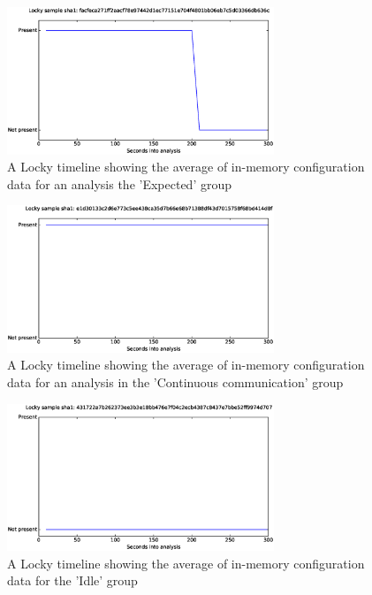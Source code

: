 \documentclass[conference]{IEEEtran}
\begin{document}
\begin{figure}[h]
    \includegraphics[width=8cm,scale=0.5]{images/locky/locky-timelines-eps/Locky-facfeca271ff2aacf78e97442d1ec77151e704f4801bb06eb7c5d03366db636c.eps}
    \caption{A Locky timeline showing the average of in-memory configuration data for an analysis the 'Expected' group}
    \label{fig:locky-timeline-expected}
\end{figure}
\begin{figure}[!h]
    \includegraphics[width=8cm,scale=0.5]{images/locky/locky-timelines-eps/Locky-e1d30133c2d6e773c5ee438ca35d7b66e68b71388df43d7015758f68bd414d8f.eps}
    \caption{A Locky timeline showing the average of in-memory configuration data for an analysis in the 'Continuous communication' group}
    \label{fig:locky-timeline-continuous}
\end{figure}
\begin{figure}[!h]
    \includegraphics[width=8cm,scale=0.5]{images/locky/locky-timelines-eps/Locky-431722a7b262373ee3b3e18bb476e7f04c2ecb4387c8437e7bbe52ff9974d707.eps}
    \caption{A Locky timeline showing the average of in-memory configuration data for the 'Idle' group}
    \label{fig:locky-timeline-idle}
\end{figure}
\end{document}
